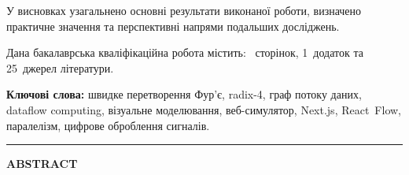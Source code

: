 У висновках узагальнено основні результати виконаної роботи,
визначено практичне значення та перспективні напрями подальших
досліджень.

Дана бакалаврська кваліфікаційна робота містить: \pageref{LastPage}~сторінок,
1~додаток та 25~джерел літератури.

\textbf{Ключові слова:} швидке перетворення Фур'є, radix-4, граф
потоку даних, dataflow computing, візуальне моделювання,
веб-симулятор, Next.js, React~Flow, паралелізм, цифрове оброблення
сигналів.

\vspace{1em}\hrule\vspace{1em}

{\centering\bfseries ABSTRACT\par}
\vspace{1em}

